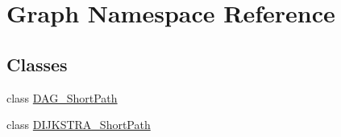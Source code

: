 \hypertarget{namespace_graph}{}\section{Graph Namespace Reference}
\label{namespace_graph}
\subsection*{Classes}
\begin{DoxyCompactItemize}
\item 
class \hyperlink{class_graph_1_1_d_a_g___short_path}{D\+A\+G\+\_\+\+Short\+Path}
\item 
class \hyperlink{class_graph_1_1_d_i_j_k_s_t_r_a___short_path}{D\+I\+J\+K\+S\+T\+R\+A\+\_\+\+Short\+Path}
\end{DoxyCompactItemize}
